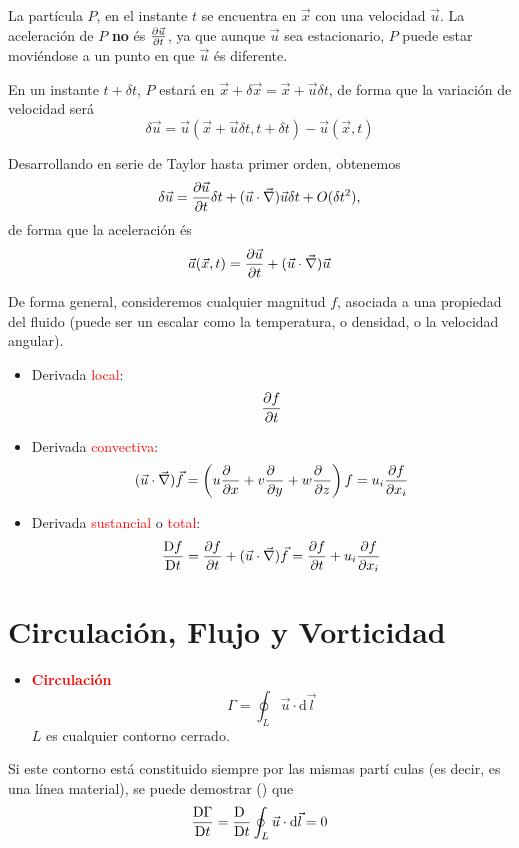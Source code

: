 	
	La partícula $P$, en el instante $t$ se encuentra en $\vec{x}$
	con una velocidad $\vec{u}$. La aceleración de $P$ \textbf{no} és
	$\frac{\partial \vec{u}}{\partial t}$, ya que aunque $\vec{u}$ sea estacionario,
	$P$ puede estar moviéndose a un punto en que $\vec{u}$ és diferente.
	
	En un instante $t+\delta t$, $P$ estará en $\vec{x}+\delta\vec{x}=\vec{x}+\vec{u}\delta t$,
	de forma que la variación de velocidad será 
	\[
	\delta\vec{u}=\vec{u}(\vec{x}+\vec{u}\delta t,t+\delta t)-\vec{u}(\vec{x},t)
	\]
	
	Desarrollando en serie de Taylor hasta primer orden, obtenemos 
	\[
	\delta\vec{u}=\frac{\partial \vec{u}}{\partial t}\delta t+(\vec{u}\cdot\vec{\nabla})\vec{u}\delta t+O(\delta t^{2}),
	\]
	de forma que la aceleración és 
	\[
	\vec{a}(\vec{x},t)=\frac{\partial \vec{u}}{\partial t}+(\vec{u}\cdot\vec{\nabla})\vec{u}
	\]
	

De forma general, consideremos cualquier magnitud $f$, asociada a
una propiedad del fluido (puede ser un escalar como la temperatura,
o densidad, o la velocidad angular). 
\begin{itemize}
	\item Derivada \textcolor{red}{local}: 
	\[
	\frac{\partial f}{\partial t}
	\]
	
	\item Derivada \textcolor{red}{convectiva}: 
	\[
	(\vec{u}\cdot\vec{\nabla})\vec{f}=\left(u\frac{\partial \phantom{f}}{\partial x}+v\frac{\partial \phantom{f}}{\partial y}+w\frac{\partial \phantom{f}}{\partial z}\right)f=u_{i}\frac{\partial f}{\partial x_{i}}
	\]
	
	\item Derivada \textcolor{red}{sustancial} o \textcolor{red}{total}: 
	\[
	\frac{\text{D}f}{\text{D}t}=\frac{\partial f}{\partial t}+(\vec{u}\cdot\vec{\nabla})\vec{f}=\frac{\partial f}{\partial t}+u_{i}\frac{\partial f}{\partial x_{i}}
	\]
	
\end{itemize}

\section{Circulación, Flujo y Vorticidad}

	
	\begin{itemize}
		\item \textbf{\textcolor{red}{Circulación}}\\
		
		\[
		\Gamma=\oint_{L}\vec{u}\cdot\text{d}\vec{l}
		\]
		$L$ es cualquier contorno cerrado.
	\end{itemize}
	Si este contorno está constituido siempre por las mismas partí culas
	(es decir, es una línea material), se puede demostrar (\cite{Vir1})
	que 
	\[
	\frac{\text{D} \Gamma}{\text{D} t}=\frac{\text{D} \phantom{t}}{\text{D} t}\oint_{L}\vec{u}\cdot\text{d}\vec{l}=0
	\]
	

